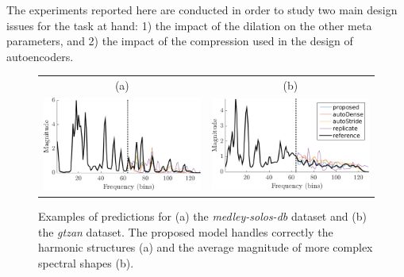 \documentclass{article}
\begin{document}
The experiments reported here are conducted in order to study two main design issues for the task at hand: 1) the impact of the dilation on the other meta parameters, and 2) the impact of the compression used in the design of autoencoders.

\begin{figure}[t]
\center
\begin{tabular}{cc}
  (a) & (b) \\
  \includegraphics[width = .95\columnwidth]{figures/solos_1141.png}
&
  \includegraphics[width = .95\columnwidth]{figures/gtzan_1120.png}
\end{tabular}
\caption{Examples of predictions for (a) the \textit{medley-solos-db} dataset and (b) the \textit{gtzan} dataset. The proposed model handles correctly the harmonic structures (a) and the average magnitude of more complex spectral shapes (b).}
\label{fig:spec}
\vspace{-2mm}
\end{figure}

\end{document}
